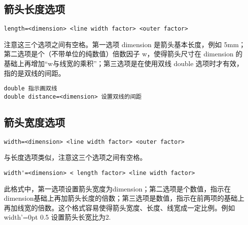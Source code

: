 \documentclass[UTF8]{ctexart}
\begin{document}
\subsection{箭头长度选项 }

\begin{lstlisting}[showspaces=true]
length=<dimension> <line width factor> <outer factor>
\end{lstlisting}
注意这三个选项之间有空格。第一选项 dimension 是箭头基本长度，例如 5mm；第二选项是个（不带单位的纯数值）倍数因子 w，使得箭头尺寸在 dimension 的基础上再增加“w与线宽的乘积”；第三选项是在使用双线 double 选项时才有效，指的是双线的间距。


\begin{lstlisting}
double 指示画双线
double distance=<dimension> 设置双线的间距
\end{lstlisting}





\subsection{箭头宽度选项}

\begin{lstlisting}[showspaces=true]
width=<dimension> <line width factor> <outer factor>
\end{lstlisting}
与长度选项类似，注意这三个选项之间有空格。
\begin{lstlisting}[showspaces=true]
width'=<dimension> < length factor> <line width factor>
\end{lstlisting}
此格式中，第一选项设置箭头宽度为dimension；第二选项是个数值，指示在dimension基础上再加箭头长度的倍数；第三选项是数值，指示在前两项的基础上再加线宽的倍数。这个格式容易使得箭头宽度、长度、线宽成一定比例。例如 width'=0pt 0.5 设置箭头长宽比为2.
\end{document}
